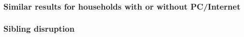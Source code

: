 \documentclass{beamer}
\begin{document}
\begin{frame}
    \label{frame:resources}
    \frametitle{Similar results for households with or without PC/Internet}
        {
    }

    \begin{flushleft}
        \hyperlink{frame:resources}{}
    \end{flushleft}       

\end{frame}

\begin{frame}
    \label{frame:siblingdisruption_siblings}
    \frametitle{Sibling disruption}
        {
    }

    \begin{flushleft}
        \hyperlink{frame:siblingdisruption}{}
    \end{flushleft}        

\end{frame}
\end{document}
